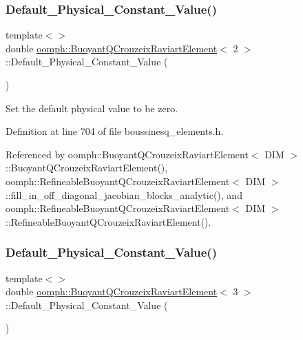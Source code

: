 \subsubsection{\texorpdfstring{Default\+\_\+\+Physical\+\_\+\+Constant\+\_\+\+Value()}{Default\_Physical\_Constant\_Value()}\hspace{0.1cm}{\footnotesize\ttfamily [1/2]}}
{\footnotesize\ttfamily template$<$$>$ \\
double \hyperlink{classoomph_1_1BuoyantQCrouzeixRaviartElement}{oomph\+::\+Buoyant\+Q\+Crouzeix\+Raviart\+Element}$<$ 2 $>$\+::Default\+\_\+\+Physical\+\_\+\+Constant\+\_\+\+Value (\begin{DoxyParamCaption}{ }\end{DoxyParamCaption})\hspace{0.3cm}{\ttfamily [private]}}



Set the default physical value to be zero. 



Definition at line 704 of file boussinesq\+\_\+elements.\+h.



Referenced by oomph\+::\+Buoyant\+Q\+Crouzeix\+Raviart\+Element$<$ D\+I\+M $>$\+::\+Buoyant\+Q\+Crouzeix\+Raviart\+Element(), oomph\+::\+Refineable\+Buoyant\+Q\+Crouzeix\+Raviart\+Element$<$ D\+I\+M $>$\+::fill\+\_\+in\+\_\+off\+\_\+diagonal\+\_\+jacobian\+\_\+blocks\+\_\+analytic(), and oomph\+::\+Refineable\+Buoyant\+Q\+Crouzeix\+Raviart\+Element$<$ D\+I\+M $>$\+::\+Refineable\+Buoyant\+Q\+Crouzeix\+Raviart\+Element().

\mbox{\label{classoomph_1_1BuoyantQCrouzeixRaviartElement_a74cccd0d2c7e943221f338fded0c18db}} 
\subsubsection{\texorpdfstring{Default\+\_\+\+Physical\+\_\+\+Constant\+\_\+\+Value()}{Default\_Physical\_Constant\_Value()}\hspace{0.1cm}{\footnotesize\ttfamily [2/2]}}
{\footnotesize\ttfamily template$<$$>$ \\
double \hyperlink{classoomph_1_1BuoyantQCrouzeixRaviartElement}{oomph\+::\+Buoyant\+Q\+Crouzeix\+Raviart\+Element}$<$ 3 $>$\+::Default\+\_\+\+Physical\+\_\+\+Constant\+\_\+\+Value (\begin{DoxyParamCaption}{ }\end{DoxyParamCaption})\hspace{0.3cm}{\ttfamily [private]}}



